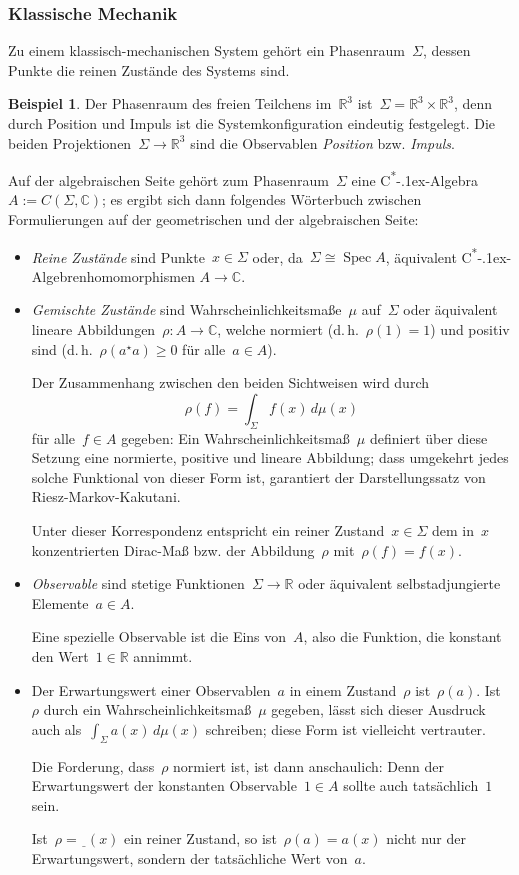\documentclass[a4paper,ngerman,12pt]{scrartcl}
\theoremstyle{definition}
\newtheorem{bsp}[defn]{Beispiel}
\theoremstyle{plain}
\theoremstyle{remark}
\newcommand{\RR}{\mathbb{R}}
\newcommand{\CC}{\mathbb{C}}
\newcommand{\freist}{\underline{\ \ }}
\newcommand{\csalgebra}{C\textsuperscript{*}\kern-.1ex-Algebra}
\newcommand{\csalgebren}{C\textsuperscript{*}\kern-.1ex-Alge\-bren}
\DeclareMathOperator{\Spec}{Spec}
\renewcommand{\_}{\mathpunct{.}\,}
\newcommand{\?}{\,{:}\,}
\begin{document}
\subsubsection*{Klassische Mechanik}

Zu einem klassisch-mechanischen System gehört ein Phasenraum~$\Sigma$, dessen
Punkte die reinen Zustände des Systems sind.

\begin{bsp}Der Phasenraum des freien Teilchens im~$\RR^3$ ist~$\Sigma = \RR^3
\times \RR^3$, denn durch Position und Impuls ist die Systemkonfiguration
eindeutig festgelegt. Die beiden Projektionen~$\Sigma \to \RR^3$ sind die
Observablen \emph{Position} bzw. \emph{Impuls}.\end{bsp}

Auf der algebraischen Seite gehört zum Phasenraum~$\Sigma$ eine \csalgebra~$A
:= C(\Sigma, \CC)$; es ergibt sich dann folgendes Wörterbuch zwischen
Formulierungen auf der geometrischen und der algebraischen Seite:

\begin{itemize}
\item \emph{Reine Zustände} sind Punkte~$x \in \Sigma$ oder, da~$\Sigma \cong \Spec
A$, äquivalent \csalgebren{}\-ho\-mo\-mor\-phis\-men $A \to \CC$.

\item \emph{Gemischte Zustände} sind Wahrscheinlichkeitsmaße~$\mu$ auf~$\Sigma$ oder
äquivalent lineare Abbildungen~$\rho : A \to \CC$, welche normiert
(d.\,h.~$\rho(1) = 1$) und positiv sind (d.\,h.~$\rho(a^\star a) \geq 0$
für alle~$a \in A$).

Der Zusammenhang zwischen den beiden Sichtweisen wird durch
\[ \rho(f) = \int_\Sigma f(x) \,d\mu(x) \]
für alle~$f \in A$ gegeben: Ein Wahrscheinlichkeitsmaß~$\mu$ definiert über
diese Setzung eine normierte, positive und lineare Abbildung; dass umgekehrt
jedes solche Funktional von dieser Form ist, garantiert der Darstellungssatz
von Riesz-Markov-Kakutani.

Unter dieser Korrespondenz entspricht ein reiner Zustand~$x \in \Sigma$ dem
in~$x$ konzentrierten Dirac-Maß bzw. der Abbildung~$\rho$ mit~$\rho(f) =
f(x)$.

\item \emph{Observable} sind stetige Funktionen~$\Sigma \to \RR$ oder
äquivalent selbstadjungierte Elemente~$a \in A$.

Eine spezielle Observable ist die Eins von~$A$, also die Funktion, die konstant
den Wert~$1 \in \RR$ annimmt.

\item Der Erwartungswert einer Observablen~$a$ in einem Zustand~$\rho$
ist~$\rho(a)$. Ist~$\rho$ durch ein Wahrscheinlichkeitsmaß~$\mu$ gegeben,
lässt sich dieser Ausdruck auch als~$\int_\Sigma a(x) \,d\mu(x)$ schreiben;
diese Form ist vielleicht vertrauter.

Die Forderung, dass~$\rho$ normiert ist, ist dann anschaulich: Denn der
Erwartungswert der konstanten Observable~$1 \in A$ sollte auch tatsächlich~$1$
sein.

Ist~$\rho = \freist(x)$ ein reiner Zustand, so ist~$\rho(a) = a(x)$ nicht nur
der Erwartungswert, sondern der tatsächliche Wert von~$a$.
\end{itemize}
\end{document}
